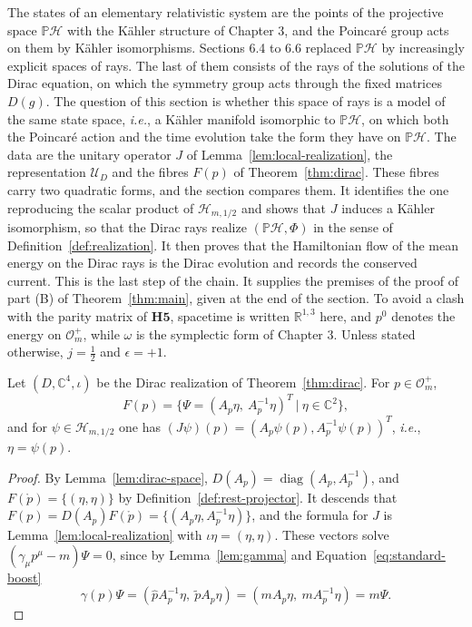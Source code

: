 The states of an elementary relativistic system are the points of the projective space $\mathbb{P}\mathcal{H}$ with the Kähler structure of Chapter 3, and the Poincar\'e group acts on them by Kähler isomorphisms. Sections 6.4 to 6.6 replaced $\mathbb{P}\mathcal{H}$ by increasingly explicit spaces of rays. The last of them consists of the rays of the solutions of the Dirac equation, on which the symmetry group acts through the fixed matrices $D(g)$. The question of this section is whether this space of rays is a model of the same state space, \textit{i.e.}, a Kähler manifold isomorphic to $\mathbb{P}\mathcal{H}$, on which both the Poincar\'e action and the time evolution take the form they have on $\mathbb{P}\mathcal{H}$. The data are the unitary operator $J$ of Lemma~\ref{lem:local-realization}, the representation $\mathcal{U}_D$ and the fibres $F(p)$ of Theorem~\ref{thm:dirac}. These fibres carry two quadratic forms, and the section compares them. It identifies the one reproducing the scalar product of $\mathcal{H}_{m,1/2}$ and shows that $J$ induces a Kähler isomorphism, so that the Dirac rays realize $(\mathbb{P}\mathcal{H},\Phi)$ in the sense of Definition~\ref{def:realization}. It then proves that the Hamiltonian flow of the mean energy on the Dirac rays is the Dirac evolution and records the conserved current. This is the last step of the chain. It supplies the premises of the proof of part (B) of Theorem~\ref{thm:main}, given at the end of the section. To avoid a clash with the parity matrix of $\mathbf{H5}$, spacetime is written $\mathbb{R}^{1,3}$ here, and $p^0$ denotes the energy on $\mathcal{O}_m^+$, while $\omega$ is the symplectic form of Chapter 3. Unless stated otherwise, $j=\tfrac12$ and $\epsilon=+1$.

\begin{proposition}\label{prop:explicit-solutions}
	Let $(D,\mathbb{C}^4,\iota)$ be the Dirac realization of Theorem~\ref{thm:dirac}. For $p\in\mathcal{O}_m^+$,
	\begin{equation*}
		F(p)=\big\{\Psi=(A_p\eta,\ A_p^{-1}\eta)^T\ \big|\ \eta\in\mathbb{C}^2\big\},
	\end{equation*}
	and for $\psi\in\mathcal{H}_{m,1/2}$ one has $(J\psi)(p)=(A_p\psi(p),A_p^{-1}\psi(p))^T$, \textit{i.e.}, $\eta=\psi(p)$.
\end{proposition}

\begin{proof}
	By Lemma~\ref{lem:dirac-space}, $D(A_p)=\operatorname{diag}(A_p,A_p^{-1})$, and $F(\mathring{p})=\{(\eta,\eta)\}$ by Definition~\ref{def:rest-projector}. It descends that $F(p)=D(A_p)F(\mathring{p})=\{(A_p\eta,A_p^{-1}\eta)\}$, and the formula for $J$ is Lemma~\ref{lem:local-realization} with $\iota\eta=(\eta,\eta)$. These vectors solve $(\gamma_\mu p^\mu-m)\Psi=0$, since by Lemma~\ref{lem:gamma} and Equation~\eqref{eq:standard-boost}
	\begin{equation*}
		\gamma(p)\Psi=(\hat{p}A_p^{-1}\eta,\ \tilde{p}A_p\eta)=(mA_p\eta,\ mA_p^{-1}\eta)=m\Psi.
	\end{equation*}
\end{proof}


